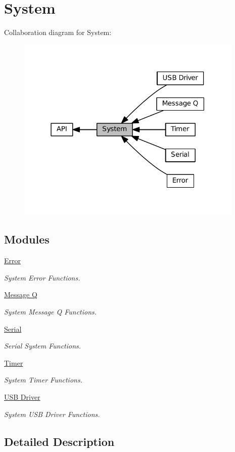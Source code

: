 \hypertarget{group__SYSTEM}{}\section{System}
\label{group__SYSTEM}
Collaboration diagram for System\+:\nopagebreak
\begin{figure}[H]
\begin{center}
\leavevmode
\includegraphics[width=307pt]{group__SYSTEM}
\end{center}
\end{figure}
\subsection*{Modules}
\begin{DoxyCompactItemize}
\item 
\hyperlink{group__SYSTEM__ERROR}{Error}
\begin{DoxyCompactList}\small\item\em System Error Functions. \end{DoxyCompactList}\item 
\hyperlink{group__SYSTEM__MESSAGE__Q}{Message Q}
\begin{DoxyCompactList}\small\item\em System Message Q Functions. \end{DoxyCompactList}\item 
\hyperlink{group__SYSTEM__SERIAL__COMM}{Serial}
\begin{DoxyCompactList}\small\item\em Serial System Functions. \end{DoxyCompactList}\item 
\hyperlink{group__SYSTEM__TIMER}{Timer}
\begin{DoxyCompactList}\small\item\em System Timer Functions. \end{DoxyCompactList}\item 
\hyperlink{group__SYSTEM__USB__DRIVER}{U\+S\+B Driver}
\begin{DoxyCompactList}\small\item\em System U\+SB Driver Functions. \end{DoxyCompactList}\end{DoxyCompactItemize}


\subsection{Detailed Description}
